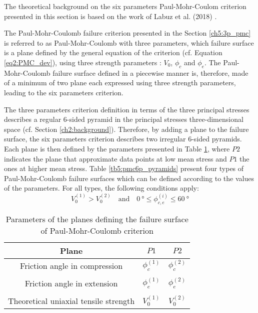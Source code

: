 The theoretical background on the six parameters Paul-Mohr-Coulom criterion presented in this section is based on the work of Labuz et al. (2018) \cite{Labuz2018}.

The Paul-Mohr-Coulomb failure criterion presented in the Section \ref{ch5:3p_pmc} is referred to as Paul-Mohr-Coulomb with three parameters, which failure surface is a plane defined by the general equation of the criterion (cf. Equation \ref{eq2:PMC_dev}), using three strength parameters : $V_0$, $\phi_c$ and $\phi_e$. The Paul-Mohr-Coulomb failure surface defined in a piecewise manner is, therefore, made of a minimum of two plane each expressed using three strength parameters, leading to the six parameters criterion.

The three parameters criterion definition in terms of the three principal stresses describes a regular 6-sided pyramid in the principal stresses three-dimensional space (cf. Section \ref{ch2:background}). Therefore, by adding a plane to the failure surface, the six parameters criterion describes two irregular 6-sided pyramids. Each plane is then defined by the parameters presented in Table \ref{tb5:pmc6p_planeparam}, where $P2$ indicates the plane that approximate data points at low mean stress and $P1$ the ones at higher mean stress. Table \ref{tb5:pmc6p_pyramids} present four types of Paul-Mohr-Coulomb failure surfaces which can be defined according to the values of the parameters. For all types, the following conditions apply: 
\begin{equation}
    V_0^{(1)} > V_0^{(2)} \quad \textrm{and} \quad \SI{0}{\degree} \leq \phi_{c,e}^{(i)} \leq \SI{60}{\degree}
\end{equation}

\begin{table}
    \centering 
    \begin{tabular}{ccc}
        \hline 
        Plane & $P1$ & $P2$  \\
        \hline
        \hline
        Friction angle in compression & $\phi_{c}^{(1)}$ & $\phi_{c}^{(2)}$ \\
        \\
        Friction angle in extension & $\phi_{e}^{(1)}$ & $\phi_{e}^{(2)}$ \\ 
        \\
        Theoretical uniaxial tensile strength & $V_0^{(1)}$ & $V_0^{(2)}$ \\
        \hline
    \end{tabular}
    \captionsetup{justification=centering}
    \caption{Parameters of the planes defining the failure surface of Paul-Mohr-Coulomb criterion}
    \label{tb5:pmc6p_planeparam}
\end{table}


